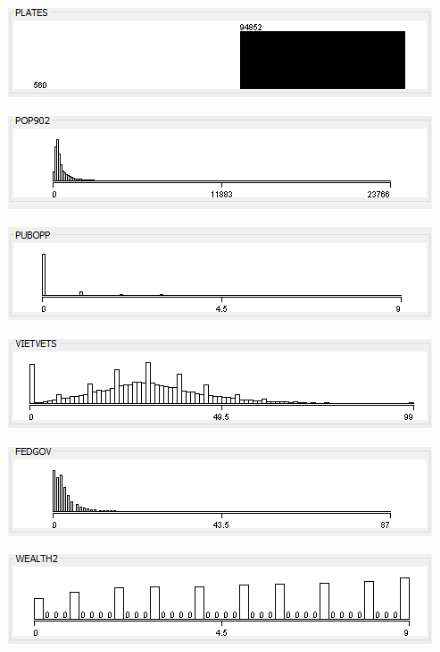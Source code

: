 \begin{figure}
\includegraphics{./images/expl_rep/Cattura2-00-08}
\end{figure}
\begin{figure}
\includegraphics{./images/expl_rep/Cattura2-00-09}
\end{figure}
\begin{figure}
\includegraphics{./images/expl_rep/Cattura2-01-00}
\end{figure}
\begin{figure}
\includegraphics{./images/expl_rep/Cattura2-01-01}
\end{figure}
\begin{figure}
\includegraphics{./images/expl_rep/Cattura2-01-02}
\end{figure}
\begin{figure}
\includegraphics{./images/expl_rep/Cattura2-01-03}
\end{figure}
